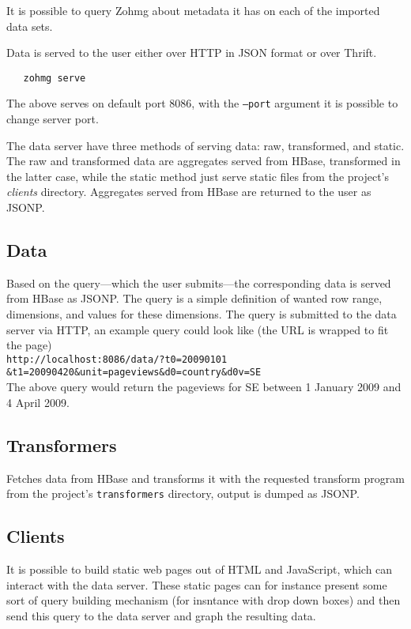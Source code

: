 \documentclass[a4paper,10pt]{book}
\begin{document}
It is possible to query Zohmg about metadata it has on each of the imported
data sets.

Data is served to the user either over HTTP in JSON format or over Thrift.

\begin{verbatim}
   zohmg serve
\end{verbatim}

\noindent The above serves on default port 8086, with the \texttt{--port}
argument it is possible to change server port.

The data server have three methods of serving data: raw, transformed, and
static. The raw and transformed data are aggregates served from HBase,
transformed in the latter case, while the static method just serve static
files from the project's \textit{clients} directory. Aggregates served from
HBase are returned to the user as JSONP.


\subsection{Data}

Based on the query---which the user submits---the corresponding data is
served from HBase as JSONP. The query is a simple definition of wanted row
range, dimensions, and values for these dimensions. The query is submitted
to the data server via HTTP, an example query could look like (the URL is
wrapped to fit the page) \\

\texttt{http://localhost:8086/data/?t0=20090101 \\
\&t1=20090420\&unit=pageviews\&d0=country\&d0v=SE} \\

The above query would return the pageviews for SE between 1 January 2009
and 4 April 2009.


\subsection{Transformers}

Fetches data from HBase and transforms it with the requested transform
program from the project's \texttt{transformers} directory, output is
dumped as JSONP.


\subsection{Clients}

It is possible to build static web pages out of HTML and JavaScript, which
can interact with the data server. These static pages can for instance
present some sort of query building mechanism (for insntance with drop down
boxes) and then send this query to the data server and graph the resulting
data.
\end{document}
